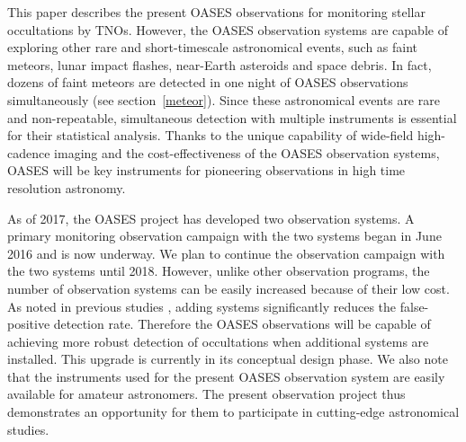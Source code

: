 \documentclass{pasj01}
\newcommand{\void}[1]{}
\renewcommand{\textcolor}{\void}
\begin{document}
This paper describes the present OASES observations for monitoring
stellar occultations by TNOs.
However, the OASES observation systems 
are capable of exploring other rare and short-timescale astronomical events,
such as faint meteors, lunar impact flashes,  near-Earth asteroids and space debris.
In fact, dozens of faint meteors are detected in one night of OASES observations simultaneously
(see section~\ref{meteor}).
Since these astronomical events are rare and non-repeatable,
simultaneous detection with multiple instruments is essential 
for their statistical analysis.
Thanks to the unique capability of wide-field high-cadence imaging 
and the cost-effectiveness of the OASES observation systems, 
OASES will be key instruments for pioneering observations 
in high time resolution astronomy.

As of 2017, the OASES project has developed two observation systems.
\textcolor{red}{
A primary monitoring observation campaign with the two systems began in June 2016
and is now underway.
We plan to continue the observation campaign with the two systems until 2018.
}
However, unlike other observation programs, 
the number of observation systems can be easily increased because of their low cost.
As noted in previous studies \citep{lehner10},
adding systems significantly reduces the false-positive detection rate.
Therefore the OASES observations will 
be capable of achieving more robust detection of occultations when additional systems are installed.
\textcolor{red}{
This upgrade is currently in its conceptual design phase.
}
We also note that the instruments used for the present OASES observation system
are easily available for amateur astronomers.
The present observation project thus demonstrates
an opportunity for them to participate in cutting-edge astronomical studies.
\end{document}
